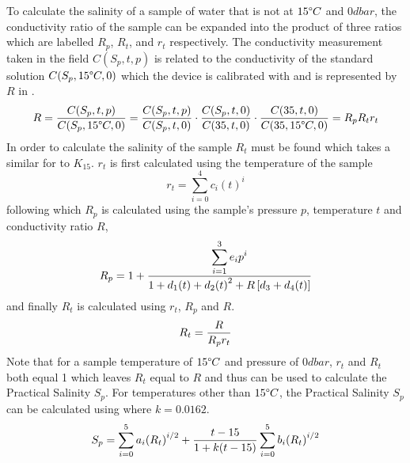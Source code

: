 To calculate the salinity of a sample of water that is not at $15\degree C$ and $0 dbar$, the conductivity ratio of the sample can be expanded into the product of three ratios which are labelled $R_p$, $R_t$, and $r_t$ respectively.
The conductivity measurement taken in the field $C(S_p, t, p)$ is related to the conductivity of the standard solution $C(S_p, 15\degree C, 0)$ which the device is calibrated with and is represented by $R$ in .~\cite{ioc_teos_2010}
\begin{equation}\label{eq:pss-78-full-ratio}
    R = \frac{\displaystyle C(S_p, t, p)}{\displaystyle C(S_p, 15\degree C, 0)} = \frac{\displaystyle C(S_p, t, p)}{\displaystyle C(S_p, t, 0)} \cdot \frac{\displaystyle C(S_p, t, 0)}{\displaystyle C(35, t, 0)} \cdot \frac{\displaystyle C(35, t, 0)}{\displaystyle C(35, 15\degree C, 0)} = R_p R_t r_t
\end{equation}
In order to calculate the salinity of the sample $R_t$ must be found which takes a similar for to $K_{15}$.
$r_t$ is first calculated using the temperature of the sample 
\begin{equation}\label{eq:pss-78-rt}
    r_t = \sum_{i=0}^{4} c_i {(t)}^i
\end{equation}
following which $R_p$ is calculated using the sample's pressure $p$, temperature $t$ and conductivity ratio $R$,
\begin{equation}\label{eq:pss-78-rp}
    R_p = 1 + \frac{\displaystyle \sum_{i=1}^{3} e_i p^i}{\displaystyle 1 + d_1 (t) + d_2 {(t)}^2 + R\left[ d_3 + d_4 (t) \right]}
\end{equation}
and finally $R_t$ is calculated using $r_t$, $R_p$ and $R$.
\begin{equation}\label{eq:pss-78-Rt}
    R_t = \frac{\displaystyle R}{\displaystyle R_p r_t}
\end{equation}
Note that for a sample temperature of $15\degree C$ and pressure of $0 dbar$, $r_t$ and $R_t$ both equal 1 which leaves $R_t$ equal to $R$ and thus  can be used to calculate the Practical Salinity $S_p$.
For temperatures other than $15\degree C$, the Practical Salinity $S_p$ can be calculated using  where $k = 0.0162$.~\cite{ioc_teos_2010}
\begin{equation}\label{eq:pss-78-full}
    S_p = \sum_{i=0}^{5} a_i {(R_t)}^{i/2} + \frac{\displaystyle t-15}{\displaystyle 1+k(t-15)} \sum_{i=0}^{5} b_i {(R_t)}^{i/2}
\end{equation}

